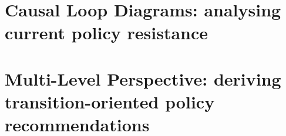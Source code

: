 \section[Causal Loop Diagrams]{Causal Loop Diagrams: analysing current policy resistance}
\label{s:methods:clds}


\section[Multi-Level Perspective]{Multi-Level Perspective: deriving transition-oriented policy recommendations}
\label{s:methods:mlp-policies}
